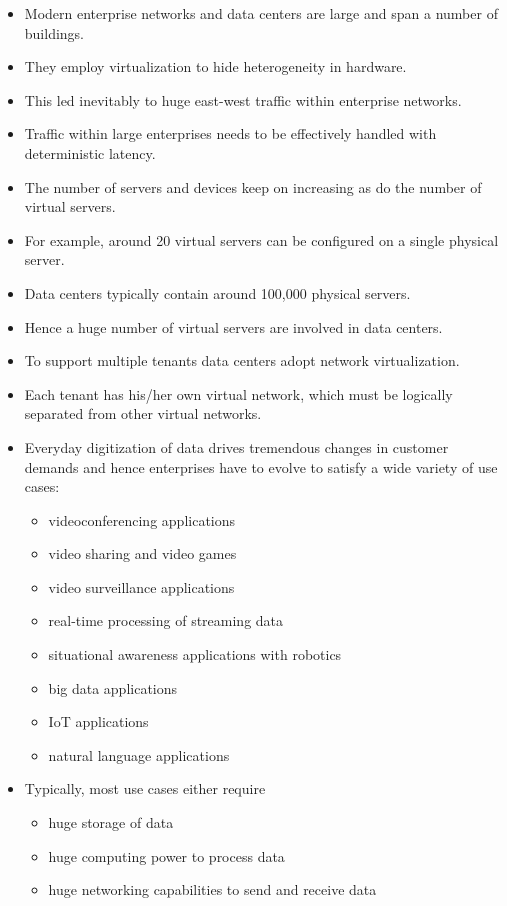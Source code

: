 \documentclass[a4paper, 12pt]{article}
\begin{document}
\begin{itemize}
\item
Modern enterprise networks and data centers are large and span a number of buildings. 
\item
They employ virtualization to hide heterogeneity in hardware.
\item
This led inevitably to huge east-west traffic within enterprise networks.
\item
Traffic within large enterprises needs to be effectively handled with deterministic latency. 
\item
The number of servers and devices keep on increasing as do the number of virtual servers. 
\item
For example, around 20 virtual servers can be configured on a single physical server.
\item
Data centers typically contain around 100,000 physical servers.
\item
Hence a huge number of virtual servers are involved in data centers.
\item
To support multiple tenants data centers adopt network virtualization. 
\item
Each tenant has his/her own virtual network, which must be logically separated from other virtual networks.
\item
Everyday digitization of data drives tremendous changes in customer demands and hence enterprises have to evolve to satisfy a wide variety of use cases:
\begin{itemize}
\item
videoconferencing applications
\item
video sharing and video games
\item
video surveillance applications
\item
real-time processing of streaming data
\item
situational awareness applications with robotics
\item
big data applications
\item
IoT applications
\item
natural language applications
\end{itemize}
\item
Typically, most use cases either require
\begin{itemize}
\item
huge storage of data
\item
huge computing power to process data
\item
huge networking capabilities to send and receive data

\end{itemize}
\end{itemize}
\end{document}
